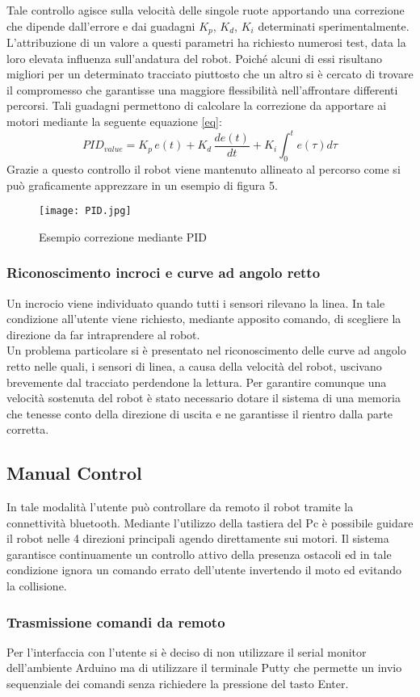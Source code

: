 \noindent Tale controllo agisce sulla velocità delle singole ruote apportando una correzione che dipende dall'errore e dai guadagni $K_p$, $K_d$, $K_i$ determinati sperimentalmente.
 L'attribuzione di un valore a questi parametri ha richiesto numerosi test, data la loro elevata influenza sull'andatura del robot. Poiché alcuni di essi risultano migliori per un determinato tracciato piuttosto che un altro si è cercato di trovare il compromesso che garantisse una maggiore flessibilità nell'affrontare differenti percorsi.
Tali guadagni permettono di calcolare la correzione da apportare ai motori mediante la seguente equazione \ref{eq}:
\begin{equation}
\label{eq}
PID_{value}=K_p\,e(t)+K_d\,\frac{de(t)}{dt}+K_i\int_0^te(\tau)d\tau
\end{equation}
Grazie a questo controllo il robot viene mantenuto allineato al percorso come si può graficamente apprezzare in un esempio di figura 5.

\begin{figure}[htb]
\centering
\label{PIDimage}
\texttt{[image: PID.jpg]} 
\caption{Esempio correzione mediante \textsc{PID}}
\end{figure}

\subsubsection{Riconoscimento incroci e curve ad angolo retto}
Un incrocio viene individuato quando tutti i sensori rilevano la linea.
In tale condizione all'utente viene richiesto, mediante apposito comando, di scegliere la direzione da far intraprendere al robot. \\
Un problema particolare si è presentato nel riconoscimento delle curve ad angolo retto nelle quali, i sensori di linea, a causa della velocità del robot, uscivano brevemente dal tracciato perdendone la lettura.
Per garantire comunque una velocità sostenuta del robot è stato necessario dotare il sistema di una memoria che tenesse conto della direzione di uscita e ne garantisse il rientro dalla parte corretta. 
\subsection{Manual Control}
In tale modalità l'utente può controllare da remoto il robot tramite la connettività bluetooth.
Mediante l'utilizzo della tastiera del Pc è possibile guidare il robot nelle 4 direzioni principali agendo direttamente sui motori.
Il sistema garantisce continuamente un controllo attivo della presenza ostacoli ed in tale condizione ignora un comando errato dell'utente invertendo il moto ed evitando la collisione.
\subsubsection{Trasmissione comandi da remoto}
Per l'interfaccia con l'utente si è deciso di non utilizzare il serial monitor dell'ambiente Arduino ma di utilizzare il terminale Putty che permette un invio sequenziale dei comandi senza richiedere la pressione del tasto Enter. 